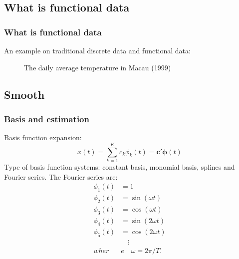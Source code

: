 \documentclass[
	9pt, %
]{beamer}
\begin{document}

\subsection{What is functional data}

\begin{frame}
	\frametitle{What is functional data}

	An example on traditional discrete data and functional data:
\begin{figure}[H]
	\centering  %
	\caption{The daily average temperature in Macau (1999) }
	\end{figure}

	\bigskip %
	
	
	\bigskip %
	
\end{frame}



\subsection{Smooth}

\begin{frame}
	\frametitle{Basis and estimation}
	Basis function expansion: 
	$$x(t) = \sum_{k=1}^Kc_k\phi_k(t) = \bm{c}'\bm{\phi}(t)$$
	Type of basis function systems: constant basis, monomial basis, splines and Fourier series. The Fourier series are:
	\begin{align*}
	\phi_{1}(t) &= 1\\
	\phi_{2}(t) &= \sin(\omega t)\\
	\phi_{3}(t) &= \cos(\omega t)\\
	\phi_{4}(t) &= \sin(2\omega t)\\
	\phi_{5}(t) &= \cos(2\omega t)\\
	&\quad  \vdots\\
	wher&e \quad \omega = 2 \pi / T.
	\end{align*}
	\end{frame}
\end{document}
